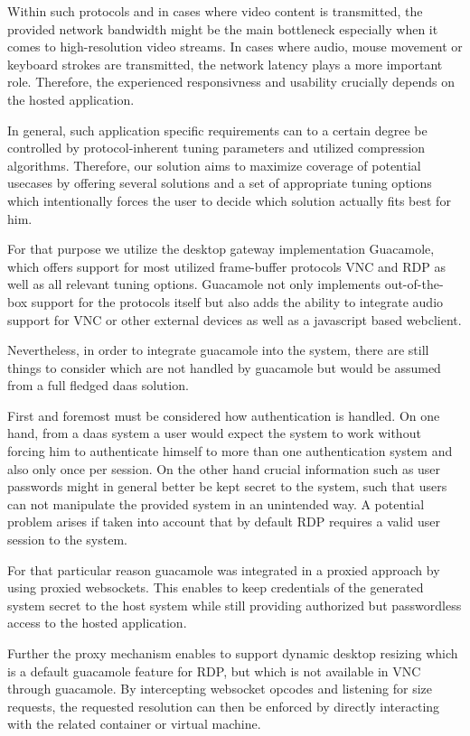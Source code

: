 \documentclass[runningheads]{llncs}
\begin{document}
Within such protocols and in cases where video content is transmitted,
the provided network bandwidth might be the main bottleneck
especially when it comes to high-resolution video streams.
In cases where audio, mouse movement or keyboard strokes are transmitted,
the network latency plays a more important role.
Therefore, the experienced responsivness and usability
crucially depends on the hosted application.

In general, such application specific requirements can to a certain degree be controlled
by protocol-inherent tuning parameters and utilized compression algorithms.
Therefore, our solution aims to maximize coverage of potential usecases
by offering several solutions and a set of appropriate tuning options
which intentionally forces the user to decide
which solution actually fits best for him.

For that purpose we utilize the desktop gateway implementation Guacamole,
which offers support for most utilized frame-buffer protocols VNC and RDP
as well as all relevant tuning options.
Guacamole not only implements out-of-the-box support for the protocols itself
but also adds the ability to integrate audio support for VNC or other external devices
as well as a javascript based webclient.

Nevertheless, in order to integrate guacamole into the system,
there are still things to consider which are not handled by guacamole
but would be assumed from a full fledged daas solution.

First and foremost must be considered how authentication is handled.
On one hand, from a daas system a user would expect the system to work
without forcing him to authenticate himself
to more than one authentication system and also only once per session.
On the other hand crucial information such as user passwords
might in general better be kept secret to the system,
such that users can not manipulate the provided system in an unintended way.
A potential problem arises if taken into account
that by default RDP requires a valid user session to the system.

For that particular reason guacamole was integrated
in a proxied approach by using proxied websockets.
This enables to keep credentials of the generated system secret to the host system
while still providing authorized but passwordless access to the hosted application.

Further the proxy mechanism enables to support dynamic desktop resizing
which is a default guacamole feature for RDP,
but which is not available in VNC through guacamole.
By intercepting websocket opcodes and listening for size requests,
the requested resolution can then be enforced
by directly interacting with the related container or virtual machine.
\end{document}

